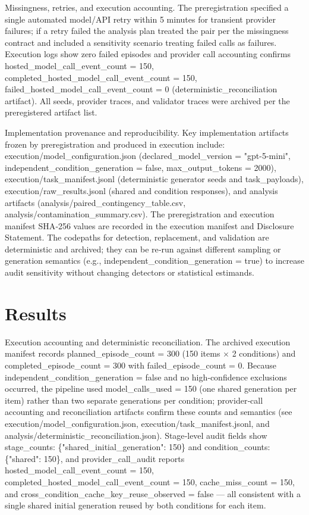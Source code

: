 \documentclass[conference]{IEEEtran}
\begin{document}
Missingness, retries, and execution accounting. The preregistration specified a single automated model/API retry within 5 minutes for transient provider failures; if a retry failed the analysis plan treated the pair per the missingness contract and included a sensitivity scenario treating failed calls as failures. Execution logs show zero failed episodes and provider call accounting confirms hosted\_model\_call\_event\_count = 150, completed\_hosted\_model\_call\_event\_count = 150, failed\_hosted\_model\_call\_event\_count = 0 (deterministic\_reconciliation artifact). All seeds, provider traces, and validator traces were archived per the preregistered artifact list.

Implementation provenance and reproducibility. Key implementation artifacts frozen by preregistration and produced in execution include: execution/model\_configuration.json (declared\_model\_version = "gpt-5-mini", independent\_condition\_generation = false, max\_output\_tokens = 2000), execution/task\_manifest.jsonl (deterministic generator seeds and task\_payloads), execution/raw\_results.jsonl (shared and condition responses), and analysis artifacts (analysis/paired\_contingency\_table.csv, analysis/contamination\_summary.csv). The preregistration and execution manifest SHA‑256 values are recorded in the execution manifest and Disclosure Statement. The codepaths for detection, replacement, and validation are deterministic and archived; they can be re‑run against different sampling or generation semantics (e.g., independent\_condition\_generation = true) to increase audit sensitivity without changing detectors or statistical estimands.

\section{Results}
Execution accounting and deterministic reconciliation. The archived execution manifest records planned\_episode\_count = 300 (150 items \ensuremath{\times} 2 conditions) and completed\_episode\_count = 300 with failed\_episode\_count = 0. Because independent\_condition\_generation = false and no high‑confidence exclusions occurred, the pipeline used model\_calls\_used = 150 (one shared generation per item) rather than two separate generations per condition; provider‑call accounting and reconciliation artifacts confirm these counts and semantics (see execution/model\_configuration.json, execution/task\_manifest.jsonl, and analysis/deterministic\_reconciliation.json). Stage‑level audit fields show stage\_counts: \{"shared\_initial\_generation": 150\} and condition\_counts: \{"shared": 150\}, and provider\_call\_audit reports hosted\_model\_call\_event\_count = 150, completed\_hosted\_model\_call\_event\_count = 150, cache\_miss\_count = 150, and cross\_condition\_cache\_key\_reuse\_observed = false --- all consistent with a single shared initial generation reused by both conditions for each item.
\end{document}
